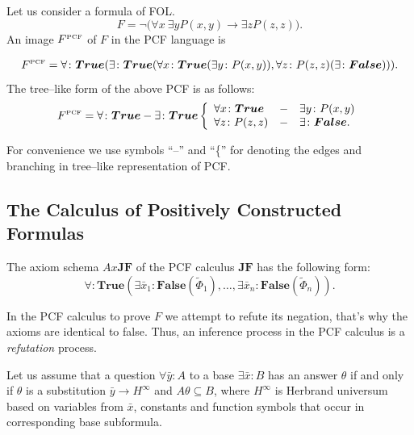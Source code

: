 \documentclass[runningheads,a4paper]{llncs}
\begin{document}
\begin{example}
Let us consider a formula of FOL.
$$F= \neg\bigl(\forall x\:\exists y P(x,y)\rightarrow \exists z P(z,z)\bigr).$$
An image $F^{\text{\tiny{PCF}}}$ of $F$ in the PCF language is

$$F^{\text{\tiny{PCF}}} = \forall\colon \boldsymbol{True}(\exists\colon\boldsymbol{True}(\forall x\colon\boldsymbol{True}(\exists y\colon P(x,y)), \forall z\colon P(z,z)(\exists\colon\boldsymbol{False}))).$$
The tree--like form of the above PCF is as follows:
$$F^{\text{\tiny{PCF}}} = \forall\colon \boldsymbol{True}-\exists\colon\boldsymbol{True} \left\{
\begin{array}{lcl}
 \forall x\colon\boldsymbol{True} & - & \exists y\colon P(x,y) \\
 \forall z\colon P(z,z) & - & \exists\colon\boldsymbol{False}.
\end{array}
\right.$$
\end{example}
For convenience we use symbols ``--'' and ``\{'' for denoting the edges and branching in tree--like representation of PCF.

\subsection{The Calculus of Positively Constructed Formulas}

The axiom schema $Ax\boldsymbol{JF}$ of the PCF calculus $\boldsymbol{JF}$ has the following form:
$$\forall\colon\boldsymbol{True}\left(\exists \bar{x}_1\colon\boldsymbol{False}\left(\widetilde{\Phi}_1\right),\ldots,\exists \bar{x}_n\colon\boldsymbol{False}\left(\widetilde{\Phi}_n\right)\right). $$

In the PCF calculus to prove $F$ we attempt to refute its negation, that's why the axioms are identical to false. Thus, an inference process in the PCF calculus is a {\em refutation} process.

\begin{definition}
\label{ircond}
Let us assume that a question $\forall \bar{y}\colon A$ to a base $\exists \bar{x}\colon B$ has an answer $\theta$  if and only if $\theta$ is a substitution $\bar{y} \rightarrow H^{\infty}$ and $A\theta \subseteq B$, where $H^{\infty}$ is Herbrand universum based on variables from $\bar{x}$, constants and function symbols that occur in corresponding base subformula.
\end{definition}
\end{document}
